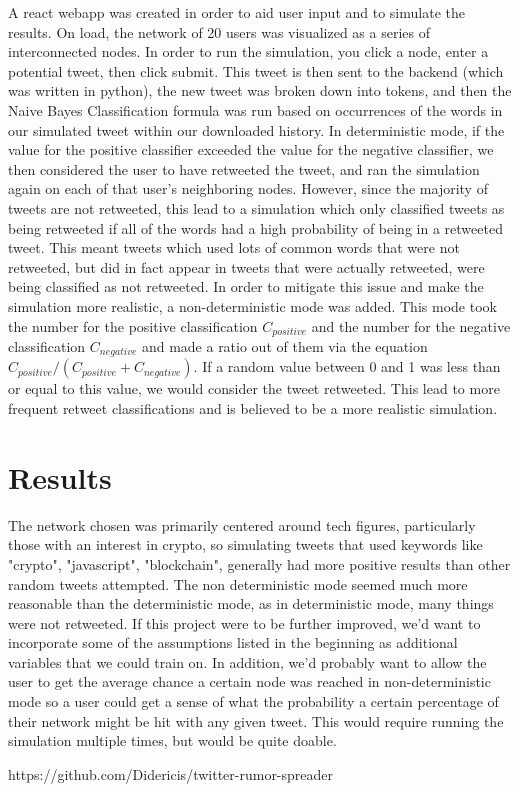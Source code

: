 \documentclass{article}
\begin{document}
A react webapp was created in order to aid user input and to simulate the results. On load, the network of 20 users was visualized as a series of interconnected nodes. In order to run the simulation, you click a node, enter a potential tweet, then click submit. This tweet is then sent to the backend (which was written in python), the new tweet was broken down into tokens, and then the Naive Bayes Classification formula was run based on occurrences of the words in our simulated tweet within our downloaded history. In deterministic mode, if the value for the positive classifier exceeded the value for the negative classifier, we then considered the user to have retweeted the tweet, and ran the simulation again on each of that user's neighboring nodes. However, since the majority of tweets are not retweeted, this lead to a simulation which only classified tweets as being retweeted if all of the words had a high probability of being in a retweeted tweet. This meant tweets which used lots of common words that were not retweeted, but did in fact appear in tweets that were actually retweeted, were being classified as not retweeted. In order to mitigate this issue and make the simulation more realistic, a non-deterministic mode was added. This mode took the number for the positive classification $C_{positive}$ and the number for the negative classification $C_{negative}$ and made a ratio out of them via the equation $C_{positive}/(C_{positive} + C_{negative})$. If a random value between 0 and 1 was less than or equal to this value, we would consider the tweet retweeted. This lead to more frequent retweet classifications and is believed to be a more realistic simulation.

\section{Results}

The network chosen was primarily centered around tech figures, particularly those with an interest in crypto, so simulating tweets that used keywords like "crypto", "javascript", "blockchain", generally had more positive results than other random tweets attempted. The non deterministic mode seemed much more reasonable than the deterministic mode, as in deterministic mode, many things were not retweeted. If this project were to be further improved, we'd want to incorporate some of the assumptions listed in the beginning as additional variables that we could train on. In addition, we'd probably want to allow the user to get the average chance a certain node was reached in non-deterministic mode so a user could get a sense of what the probability a certain percentage of their network might be hit with any given tweet. This would require running the simulation multiple times, but would be quite doable.

https://github.com/Didericis/twitter-rumor-spreader
\end{document}

